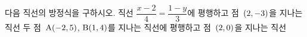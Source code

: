 다음 직선의 방정식을 구하시오.
 직선 $\dfrac{x-2}{4}=\dfrac{1-y}{3}$에 평행하고 점~$(2{,}\mkern3mu\mathopen{}-3)$을 지나는 직선
 두 점~$\mathrm{A}(-2{,}\mkern3mu\mathopen{}5)$, $\mathrm{B}(1{,}\mkern3mu\mathopen{}4)$를 지나는 직선에 평행하고 점~$(2{,}\mkern3mu\mathopen{}0)$을 지나는 직선
